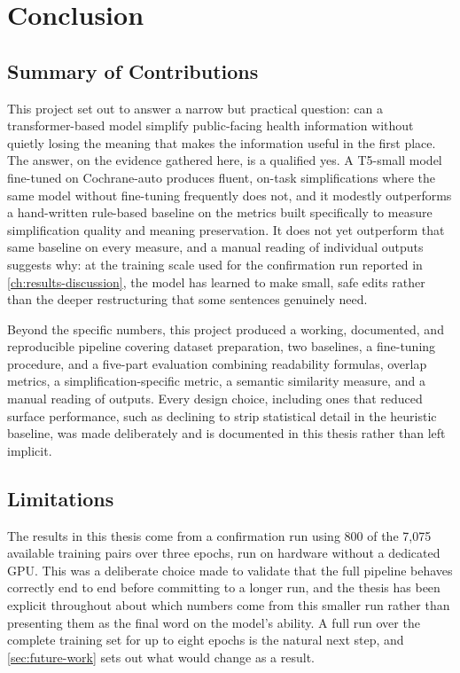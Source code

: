 \chapter{Conclusion}
\label{ch:conclusion}

\section{Summary of Contributions}
\label{sec:summary-contributions}

This project set out to answer a narrow but practical question: can a transformer-based model simplify public-facing health information without quietly losing the meaning that makes the information useful in the first place. The answer, on the evidence gathered here, is a qualified yes. A T5-small model fine-tuned on Cochrane-auto produces fluent, on-task simplifications where the same model without fine-tuning frequently does not, and it modestly outperforms a hand-written rule-based baseline on the metrics built specifically to measure simplification quality and meaning preservation. It does not yet outperform that same baseline on every measure, and a manual reading of individual outputs suggests why: at the training scale used for the confirmation run reported in \cref{ch:results-discussion}, the model has learned to make small, safe edits rather than the deeper restructuring that some sentences genuinely need.

Beyond the specific numbers, this project produced a working, documented, and reproducible pipeline covering dataset preparation, two baselines, a fine-tuning procedure, and a five-part evaluation combining readability formulas, overlap metrics, a simplification-specific metric, a semantic similarity measure, and a manual reading of outputs. Every design choice, including ones that reduced surface performance, such as declining to strip statistical detail in the heuristic baseline, was made deliberately and is documented in this thesis rather than left implicit.

\section{Limitations}
\label{sec:limitations}

The results in this thesis come from a confirmation run using 800 of the 7{,}075 available training pairs over three epochs, run on hardware without a dedicated GPU. This was a deliberate choice made to validate that the full pipeline behaves correctly end to end before committing to a longer run, and the thesis has been explicit throughout about which numbers come from this smaller run rather than presenting them as the final word on the model's ability. A full run over the complete training set for up to eight epochs is the natural next step, and \cref{sec:future-work} sets out what would change as a result.

